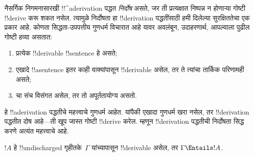 \documentclass[../../../include/open-logic-section]{subfiles}
\begin{document}
      {}
      {}


\begin{explain}
नैसर्गिक निगमनासारखी !!^a{derivation} पद्धत \emph{निर्दोष} असते, जर ती
प्रत्यक्षात निष्पन्न न होणाऱ्या गोष्टी !!{derive} करू शकत नसेल. त्यामुळे
निर्दोषता हा !!{derivation} पद्धतींसाठी हमी दिलेल्या सुरक्षिततेचा एक प्रकार
आहे. कोणता सिद्धता-उपपत्तीय गुणधर्म विचारात आहे यावर अवलंबून, उदाहरणार्थ,
आपल्याला पुढील गोष्टी हव्या असतात:
\begin{enumerate}
\item प्रत्येक !!{derivable} !!{sentence} हे  असते;
\item एखादे !!a{sentence} इतर काही वाक्यांपासून !!{derivable} असेल, तर ते
  त्यांचा तार्किक परिणामही असते;
\item {}चा संच विसंगत असेल, तर तो अपूर्ततायोग्य असतो.
\end{enumerate}
हे !!a{derivation} पद्धतीचे महत्त्वाचे गुणधर्म आहेत. यांपैकी एखादा गुणधर्म
खरा नसेल, तर !!{derivation} पद्धतीत दोष आहे---ती खूप जास्त गोष्टी
!!{derive} करेल. म्हणून !!{derivation} पद्धतीची निर्दोषता सिद्ध करणे अत्यंत
महत्त्वाचे आहे.
\end{explain}

\begin{thm}[निर्दोषता]
$!A$ हे !!{undischarged} गृहीतके~$\Gamma$ यांच्यापासून !!{derivable} असेल, तर
$\Gamma \Entails !A$.
\end{thm}
\end{document}
